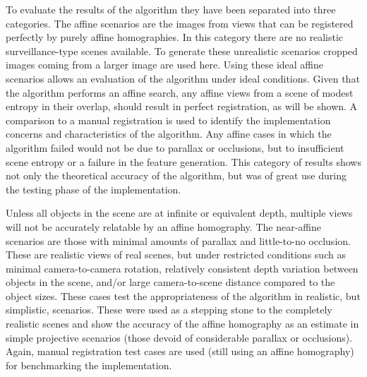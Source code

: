%
%
%
%
%
%
%
%
%

%
%
%



To evaluate the results of the algorithm they have been separated into three categories. The affine scenarios are the images from views that can be registered perfectly by purely affine homographies. In this category there are no realistic surveillance-type scenes available. To generate these unrealistic scenarios cropped images coming from a larger image are used here. Using these ideal affine scenarios allows an evaluation of the algorithm under ideal conditions. Given that the algorithm performs an affine search, any affine views from a scene of modest entropy in their overlap, should result in perfect registration, as will be shown. A comparison to a manual registration is used to identify the implementation concerns and characteristics of the algorithm. Any affine cases in which the algorithm failed would not be due to parallax or occlusions, but to insufficient scene entropy or a failure in the feature generation. This category of results shows not only the theoretical accuracy of the algorithm, but was of great use during the testing phase of the implementation.

Unless all objects in the scene are at infinite or equivalent depth, multiple views will not be accurately relatable by an affine homography. The near-affine scenarios are those with minimal amounts of parallax and little-to-no occlusion. These are realistic views of real scenes, but under restricted conditions such as minimal camera-to-camera rotation, relatively consistent depth variation between objects in the scene, and/or large camera-to-scene distance compared to the object sizes. These cases test the appropriateness of the algorithm in realistic, but simplistic, scenarios. These were used as a stepping stone to the completely realistic scenes and show the accuracy of the affine homography as an estimate in simple projective scenarios (\ie { }those devoid of considerable parallax or occlusions). Again, manual registration test cases are used (still using an affine homography) for benchmarking the implementation.

